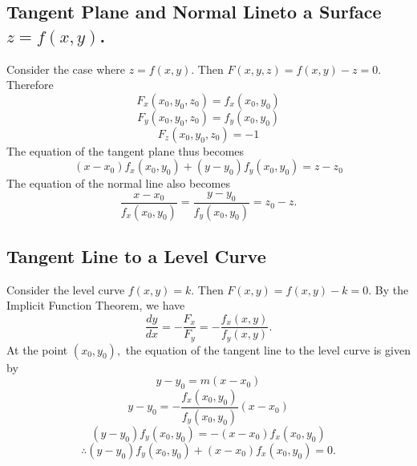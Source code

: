 \documentclass{article}
\begin{document}
\subsection{Tangent Plane and Normal Lineto a Surface $z=f(x,y)$.}
Consider the case where $z=f(x,y).$ Then $F(x,y,z)=f(x,y)-z=0.$ Therefore
$$F_x(x_0,y_0,z_0)=f_x(x_0,y_0)$$
$$F_y(x_0,y_0,z_0)=f_y(x_0,y_0)$$
$$F_z(x_0,y_0,z_0)=-1$$
The equation of the tangent plane thus becomes
$$(x-x_0)f_x(x_0,y_0)+(y-y_0)f_y(x_0,y_0)=z-z_0$$
The equation of the normal line also becomes
$$\frac{x-x_0}{f_x(x_0,y_0)}=\frac{y-y_0}{f_y(x_0,y_0)}=z_0-z.$$
\subsection{Tangent Line to a Level Curve}
Consider the level curve $f(x,y)=k$. Then $F(x,y)=f(x,y)-k=0.$ By the Implicit Function Theorem, we have
$$\frac{dy}{dx}=-\frac{F_x}{F_y}=-\frac{f_x(x,y)}{f_y(x,y)}.$$
At the point $(x_0,y_0),$ the equation of the tangent line to the level curve is given by 
$$y-y_0=m(x-x_0)$$
$$y-y_0=-\frac{f_x(x_0,y_0)}{f_y(x_0,y_0)}(x-x_0)$$
$$(y-y_0)f_y(x_0,y_0)=-(x-x_0)f_x(x_0,y_0)$$
$$\therefore(y-y_0)f_y(x_0,y_0)+(x-x_0)f_x(x_0,y_0)=0.$$
\end{document}

